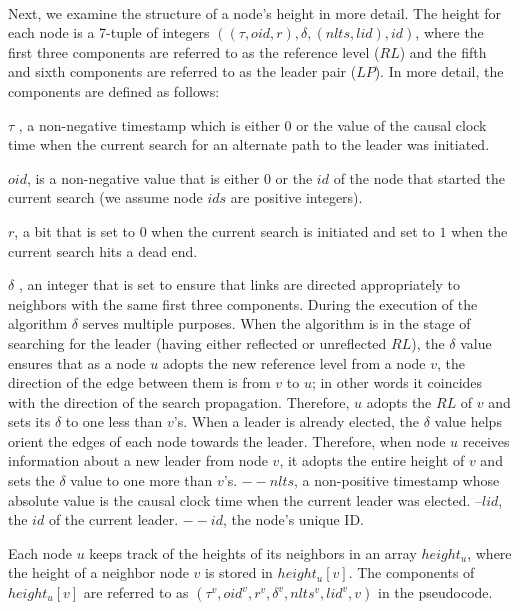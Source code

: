 \paragraph{}Next, we examine the structure of a node’s height in more detail. The height for each node is a 7-tuple of integers $((\tau , oid, r), \delta , (nlts, lid), id)$, where the first three components are referred to as the reference level ($RL$) and the fifth and sixth components are referred to as the leader pair ($LP$). In more detail, the components are defined as follows:
\begin{list}{--}{spacing}
	\item $\tau$ , a non-negative timestamp which is either $0$ or the value of the causal clock time when the current search for an alternate path to the leader was initiated.
	\item $oid$, is a non-negative value that is either $0$ or the $id$ of the node that started the current search (we assume node $ids$ are positive integers).
	\item $r$, a bit that is set to $0$ when the current search is initiated and set to $1$ when the current search hits a dead end.
	\item  $\delta$ , an integer that is set to ensure that links are directed appropriately to neighbors with the same first three components. During the execution of the algorithm $\delta$ serves multiple purposes. When the algorithm is in the stage of searching for the leader (having either reflected or unreflected $RL$), the $\delta$ value ensures that as a node $u$ adopts the new reference level from a node $v$, the direction of the edge between them is from $v$ to $u$; in other words it coincides with the direction of the search propagation. Therefore, $u$ adopts the $RL$ of $v$ and sets its $\delta$ to one less than $v$’s. When a leader is already elected, the $\delta$ value helps orient the edges of each node towards the leader. Therefore, when node $u$ receives information about a new leader from node $v$, it adopts the entire height of $v$ and sets the $\delta$ value to one more than $v$’s. $-- nlts$, a non-positive timestamp whose absolute value is the causal clock time when the current leader was elected. $– lid$, the $id$ of the current leader. $-- id$, the node’s unique ID.
\end{list}
Each node $u$ keeps track of the heights of its neighbors in an array $height_u$, where the height of a neighbor node $v$ is stored in $height_u[v]$. The components of $height_u[v]$ are referred to as $(\tau ^v , oid^v , r^v , \delta ^v , nlts^v , lid^v , v)$ in the pseudocode.
